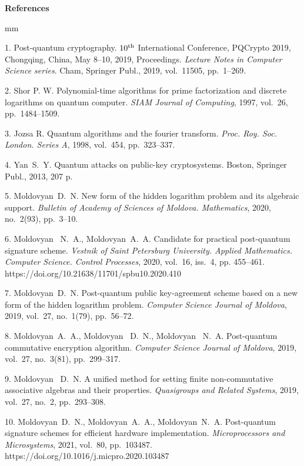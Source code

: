 

{\small



\vskip6mm

\noindent \textbf{References} }

 mm

{\footnotesize



1. Post-quantum cryptography. $10^{\mbox {\scriptsize th}}$ International Conference, PQCrypto 2019, Chongqing, China, May 8--10, 2019, Proceedings. {\it Lecture Notes in Computer Science series}. Cham, Springer Publ., 2019, vol.~11505, pp.~1--269.

2. Shor P. W. Polynomial-time algorithms for prime factorization and discrete logarithms on quantum computer. \textit{SIAM Journal of Computing}, 1997, vol.~26, pp.~1484--1509.

3. Jozsa R. Quantum algorithms and the fourier transform. \textit{Proc. 
Roy. Soc. London. Series A}, 1998, vol.~454, pp.~323--337.

4. Yan~S.~Y. Quantum attacks on public-key cryptosystems. Boston, Springer Publ., 2013, 207 p.

5. Moldovyan~D.~N. New form of the hidden logarithm problem and its algebraic support. {\it  Bulletin of Academy of Sciences of Moldova. Mathematics}, 2020, no.~2(93), pp.~3--10.

6. Moldovyan~ N.~A., Moldovyan~A.~A. Candidate for practical post-quantum signature scheme. {\it Vest\-nik of Saint Petersburg University. Applied Mathematics. Computer Science. Control Processes}, 2020, vol.~16, iss.~4, pp. 455--461. 
https://doi.org/10.21638/11701/spbu10.2020.410

7. Moldovyan~D.~N. Post-quantum public key-agreement scheme based on a new form of the hidden logarithm problem. \textit{Computer Science Journal of Moldova}, 2019, vol.~27, no.~1(79), pp.~56--72.

8. Moldovyan~A.~A., Moldovyan~ D.~N., Moldovyan~ N.~A. 
Post-quantum commutative encryption algorithm. \textit{Computer Science Journal of Moldova}, 2019, vol.~27, no.~3(81), pp.~299--317.  

9. Moldovyan~ D.~N. A unified method for setting finite non-commutative associative algebras and their properties. \textit{Quasigroups and Related Systems}, 2019, vol.~27, no.~2, pp.~293--308.

10. Moldovyan~D.~N., Moldovyan~A.~A., Moldovyan~N.~A.   Post-quantum signature schemes for ef\-fi\-cient hardware implementation. \textit{Microprocessors and Microsystems}, 2021, vol.~80, pp.~103487.\\
https://doi.org/10.1016/j.micpro.2020.103487

}
